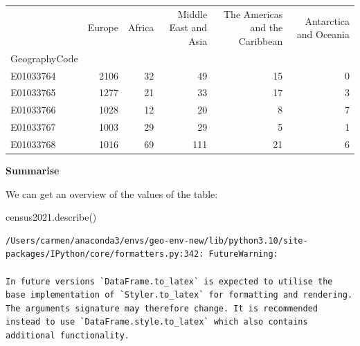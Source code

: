 \documentclass[
  letterpaper,
  DIV=11,
  numbers=noendperiod]{scrreprt}
\newenvironment{Shaded}{\begin{snugshade}}{\end{snugshade}}
\newcommand{\NormalTok}[1]{\textcolor[rgb]{0.00,0.23,0.31}{#1}}
\begin{document}
\begin{tabular}{lrrrrr}
\toprule
{} &  Europe &  Africa &  Middle East and Asia &  The Americas and the Caribbean &  Antarctica and Oceania \\
GeographyCode &         &         &                       &                                 &                         \\
\midrule
E01033764     &    2106 &      32 &                    49 &                              15 &                       0 \\
E01033765     &    1277 &      21 &                    33 &                              17 &                       3 \\
E01033766     &    1028 &      12 &                    20 &                               8 &                       7 \\
E01033767     &    1003 &      29 &                    29 &                               5 &                       1 \\
E01033768     &    1016 &      69 &                   111 &                              21 &                       6 \\
\bottomrule
\end{tabular}

\textbf{Summarise}

We can get an overview of the values of the table:

\begin{Shaded}
\begin{Highlighting}[]
\NormalTok{census2021.describe()}
\end{Highlighting}
\end{Shaded}

\begin{verbatim}
/Users/carmen/anaconda3/envs/geo-env-new/lib/python3.10/site-packages/IPython/core/formatters.py:342: FutureWarning:

In future versions `DataFrame.to_latex` is expected to utilise the base implementation of `Styler.to_latex` for formatting and rendering. The arguments signature may therefore change. It is recommended instead to use `DataFrame.style.to_latex` which also contains additional functionality.
\end{verbatim}
\end{document}
